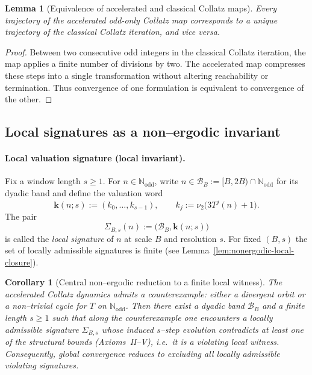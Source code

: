 \documentclass[preprint,12pt]{elsarticle}
\newtheorem{lemma}{Lemma}
\newtheorem{corollary}{Corollary}
\begin{document}
\begin{lemma}[Equivalence of accelerated and classical Collatz maps]
Every trajectory of the accelerated odd-only Collatz map corresponds to a unique trajectory of the classical Collatz iteration, and vice versa.
\end{lemma}

\begin{proof}
Between two consecutive odd integers in the classical Collatz iteration, the map applies a finite number of divisions by two.
The accelerated map compresses these steps into a single transformation without altering reachability or termination.
Thus convergence of one formulation is equivalent to convergence of the other.
\end{proof}

\subsection*{Local signatures as a non--ergodic invariant}\label{subsec:local_signature_invariant}

\paragraph{Local valuation signature (local invariant).}
Fix a window length $s\ge 1$.
For $n\in\mathbb{N}_{\mathrm{odd}}$, write $n\in\mathcal{B}_B:=[B,2B)\cap\mathbb{N}_{\mathrm{odd}}$ for its dyadic band and define the valuation word
\[
\mathbf{k}(n;s):=(k_0,\dots,k_{s-1}),\qquad k_j:=\nu_2\!\bigl(3T^j(n)+1\bigr).
\]
The pair
\[
\Sigma_{B,s}(n):=\bigl(\mathcal{B}_B,\mathbf{k}(n;s)\bigr)
\]
is called the \emph{local signature} of $n$ at scale $B$ and resolution $s$. For fixed $(B,s)$ the set of locally admissible signatures is finite (see Lemma~\ref{lem:nonergodic-local-closure}).

\begin{corollary}[Central non--ergodic reduction to a finite local witness]\label{cor:central_local_signature}
The accelerated Collatz dynamics admits a counterexample: either a divergent orbit or a non--trivial cycle for $T$ on $\mathbb{N}_{\mathrm{odd}}$.
Then there exist a dyadic band $\mathcal{B}_B$ and a finite length $s\ge 1$ such that along the counterexample one encounters a \emph{locally admissible} signature $\Sigma_{B,s}$ whose induced $s$--step evolution contradicts at least one of the structural bounds (Axioms~II--V), i.e.\ it is a \emph{violating local witness}.
Consequently, global convergence reduces to excluding all locally admissible violating signatures.
\end{corollary}
\end{document}
